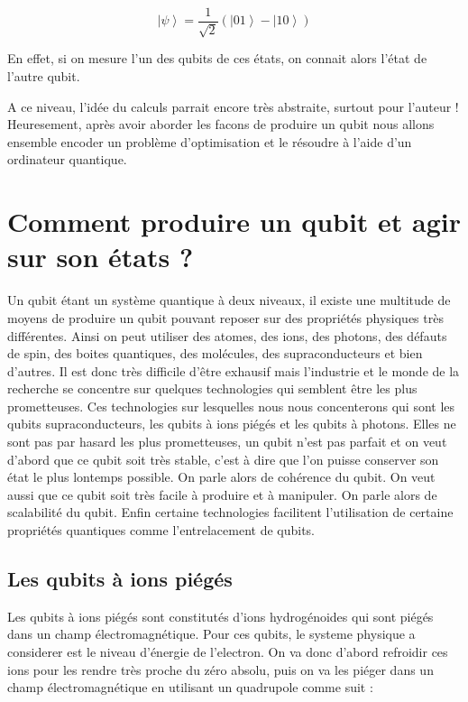 \documentclass{article}
\begin{document}
\begin{multicols}{2}
\begin{equation}
    \left|\psi\right> = \frac{1}{\sqrt{2}}\left(\left|01\right> - \left|10\right>\right)
\end{equation}

En effet, si on mesure l'un des qubits de ces états, on connait alors l'état de l'autre qubit.

A ce niveau, l'idée du calculs parrait encore très abstraite, surtout pour l'auteur !
Heuresement, après avoir aborder les facons de produire un qubit nous allons ensemble encoder un problème d'optimisation et le résoudre à l'aide d'un ordinateur quantique.



\section{Comment produire un qubit et agir sur son états ?}

Un qubit étant un système quantique à deux niveaux, il existe une multitude de moyens de produire un qubit pouvant reposer sur des propriétés physiques très différentes.
Ainsi on peut utiliser des atomes, des ions, des photons, des défauts de spin, des boites quantiques, des molécules, des supraconducteurs et bien d'autres.
Il est donc très difficile d'être exhausif mais l'industrie et le monde de la recherche se concentre sur quelques technologies qui semblent être les plus prometteuses.
Ces technologies sur lesquelles nous nous concenterons qui sont les qubits supraconducteurs, les qubits à ions piégés et les qubits à photons. 
Elles ne sont pas par hasard les plus prometteuses, un qubit n'est pas parfait et on veut d'abord que ce qubit soit très stable, c'est à dire que l'on puisse conserver son état le plus lontemps possible. On parle alors de cohérence du qubit.
On veut aussi que ce qubit soit très facile à produire et à manipuler. On parle alors de scalabilité du qubit.
Enfin certaine technologies facilitent l'utilisation de certaine propriétés quantiques comme l'entrelacement de qubits.


\subsection{Les qubits à ions piégés}

Les qubits à ions piégés sont constitutés d'ions hydrogénoides qui sont piégés dans un champ électromagnétique.
Pour ces qubits, le systeme physique a considerer est le niveau d'énergie de l'electron. 
On va donc d'abord refroidir ces ions pour les rendre très proche du zéro absolu, puis on va les piéger dans un champ électromagnétique en utilisant un quadrupole comme suit :



\end{multicols}
\end{document}
